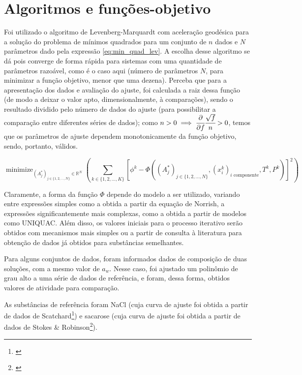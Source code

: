 \documentclass[
	12pt,				%
	openright,
	twoside,
	a4paper,			%
	english,			%
	french,				%
	spanish,			%
	brazil				%
	]{abntex2}
\DeclareMathOperator*{\minimize}{minimize}
\begin{document}
\chapter{Algoritmos e funções-objetivo}

Foi utilizado o algoritmo de Levenberg-Marquardt com aceleração geodésica para a
solução do problema de mínimos quadrados para um conjunto de $n$ dados e $N$
parâmetros dado pela expressão \ref{eq:min_quad_lev}.
A escolha desse algoritmo se dá pois converge de forma rápida para sistemas com
uma quantidade de parâmetros razoável, como é o caso aqui (número de parâmetros
$N$, para minimizar a função objetivo, menor que uma dezena).
Perceba que para a apresentação dos dados e avaliação do ajuste, foi calculada a
raiz dessa função (de modo a deixar o valor apto, dimensionalmente, à comparações),
sendo o resultado dividido pelo número de dados do ajuste (para possibilitar a
comparação entre diferentes séries de dados); como
$n>0 \implies \cfrac{\partial}{\partial f}\cfrac{\sqrt{f}}{n} >0$, temos que os
parâmetros de ajuste dependem monotonicamente da função objetivo, sendo, portanto,
válidos.

\begin{equation}
	\label{eq:min_quad_lev}
	\minimize_{(A_j^*)_{j \in \{1,2,\ldots,N\}} \in \mathbb{R}^N}%
	\left(\sum_{k \in \{1,2,\ldots,K\}}\left[\phi^k - \Phi((A^*_j)_{j%
	\in \{1, 2, \ldots, N\}}, (x^k_i)_\text{$i$ componente},%
	T^k, P^k)\right]^2\right)
\end{equation}

Claramente, a forma da função $\Phi$ depende do modelo a ser utilizado, variando
entre expressões simples como a obtida a partir da equação de Norrish, a
expressões significantemente mais complexas, como a obtida a partir de modelos
como UNIQUAC. Além disso, os valores iniciais para o processo iterativo serão
obtidos com mecanismos mais simples ou a partir de consulta à literatura para
obtenção de dados já obtidos para substâncias semelhantes.

Para alguns conjuntos de dados, foram informados dados de composição de duas
soluções, com a mesmo valor de $a_w$. Nesse caso, foi ajustado um polinômio
de grau alto a uma série de dados de referência, e foram, dessa forma, obtidos
valores de atividade para comparação.

As substâncias de referência foram NaCl (cuja curva de ajuste foi obtida a
partir de dados de Scatchard\footnote{\cite{scatchard1938}}) e sacarose (cuja
curva de ajuste foi obtida a partir de dados de Stokes \& Robinson\footnote{%
\cite{stokes1961}}).
\end{document}
